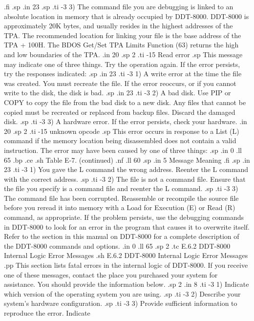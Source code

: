 .fi
.sp
.in 23
.sp
.ti -3
3) The command file you are debugging is linked to an absolute location in 
memory that is already occupied by DDT-8000.  DDT-8000 is approximately 20K 
bytes, and usually resides in the highest 
addresses of the TPA.  The recommended location for linking your file is the 
base address of the TPA + 100H.  The BDOS Get/Set TPA 
Limits Function (63) returns the high and low boundaries of the TPA.
.in 20
.sp 2
.ti -15
Read error
.sp
This message may indicate one of three things.  Try the operation again.  If 
the error persists, try the responses indicated:
.sp
.in 23
.ti -3
1) A write error at the time the file was created.  You must recreate the 
file.  If the error reoccurs, or if 
you cannot write to the disk, the disk is bad.
.sp
.in 23
.ti -3
2) A bad disk.  Use PIP or COPY to copy the file from the bad
disk to a new disk.  Any files that cannot be copied must be 
recreated or replaced from backup files.  Discard the damaged 
disk.
.sp
.ti -3
3) A hardware error.  If the error persists, check your hardware.
.in 20
.sp 2
.ti -15
unknown opcode
.sp
This error occurs in response to a List (L) command if 
the memory location being disassembled does not contain a valid instruction.
The error may have been caused by one of three things:  
.sp
.in 0
.ll 65
.bp
.ce
.sh
Table E-7.  (continued)
.nf
.ll 60
.sp
.in 5
Message        Meaning
.fi
.sp
.in 23
.ti -3
1) You gave the L command the wrong address.  Reenter the L command with the 
correct address.
.sp
.ti -3
2) The file is not a command file.  Ensure that the file you specify is a 
command file and reenter the L command.
.sp
.ti -3
3) The command file has been corrupted.  Reassemble or recompile the source 
file 
before you reread it into memory with a Load for Execution (E) or 
Read (R) command, as appropriate.  If the problem persists, use the 
debugging commands in DDT-8000 to look for an error in the program 
that causes it to overwrite itself.  Refer to the section in this manual 
on DDT-8000 for a complete description of the DDT-8000 commands and 
options.
.in 0
.ll 65
.sp 2
.tc         E.6.2  DDT-8000 Internal Logic Error Messages
.sh
E.6.2  DDT-8000 Internal Logic Error Messages
.pp
This section lists fatal errors in the internal logic of DDT-8000.  If you
receive one of these messages, contact the place you purchased 
your system for assistance.  
You should provide the information below.
.sp 2
.in 8
.ti -3
1) Indicate which version of the operating system you are using.
.sp
.ti -3
2) Describe your system's hardware configuration.
.sp
.ti -3
3) Provide sufficient information to reproduce the error.  Indicate 
